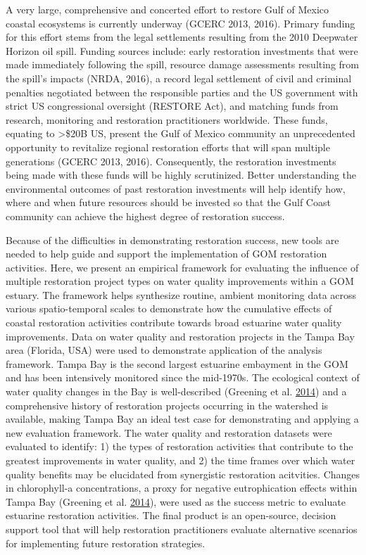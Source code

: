 \documentclass[]{article}
\begin{document}
A very large, comprehensive and concerted effort to restore Gulf of
Mexico coastal ecosystems is currently underway (GCERC 2013, 2016).
Primary funding for this effort stems from the legal settlements
resulting from the 2010 Deepwater Horizon oil spill. Funding sources
include: early restoration investments that were made immediately
following the spill, resource damage assessments resulting from the
spill's impacts (NRDA, 2016), a record legal settlement of civil and
criminal penalties negotiated between the responsible parties and the US
government with strict US congressional oversight (RESTORE Act), and
matching funds from research, monitoring and restoration practitioners
worldwide. These funds, equating to \textgreater{}\$20B US, present the
Gulf of Mexico community an unprecedented opportunity to revitalize
regional restoration efforts that will span multiple generations (GCERC
2013, 2016). Consequently, the restoration investments being made with
these funds will be highly scrutinized. Better understanding the
environmental outcomes of past restoration investments will help
identify how, where and when future resources should be invested so that
the Gulf Coast community can achieve the highest degree of restoration
success.

Because of the difficulties in demonstrating restoration success, new
tools are needed to help guide and support the implementation of GOM
restoration activities. Here, we present an empirical framework for
evaluating the influence of multiple restoration project types on water
quality improvements within a GOM estuary. The framework helps
synthesize routine, ambient monitoring data across various
spatio-temporal scales to demonstrate how the cumulative effects of
coastal restoration activities contribute towards broad estuarine water
quality improvements. Data on water quality and restoration projects in
the Tampa Bay area (Florida, USA) were used to demonstrate application
of the analysis framework. Tampa Bay is the second largest estuarine
embayment in the GOM and has been intensively monitored since the
mid-1970s. The ecological context of water quality changes in the Bay is
well-described (Greening et al.
\protect\hyperlink{ref-Greening2014}{2014}) and a comprehensive history
of restoration projects occurring in the watershed is available, making
Tampa Bay an ideal test case for demonstrating and applying a new
evaluation framework. The water quality and restoration datasets were
evaluated to identify: 1) the types of restoration activities that
contribute to the greatest improvements in water quality, and 2) the
time frames over which water quality benefits may be elucidated from
synergistic restoration acitvities. Changes in chlorophyll-a
concentrations, a proxy for negative eutrophication effects within Tampa
Bay (Greening et al. \protect\hyperlink{ref-Greening2014}{2014}), were
used as the success metric to evaluate estuarine restoration activities.
The final product is an open-source, decision support tool that will
help restoration practitioners evaluate alternative scenarios for
implementing future restoration strategies.
\end{document}
